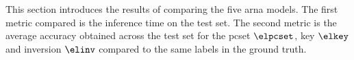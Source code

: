 
This section introduces the results of comparing the five
\gls{arna} models. The first metric compared is the
inference time on the test set. The second metric is the
average accuracy obtained across the test set for the
\gls{pcset} $\elpcset$, key $\elkey$ and inversion $\elinv$
compared to the same labels in the ground truth.

